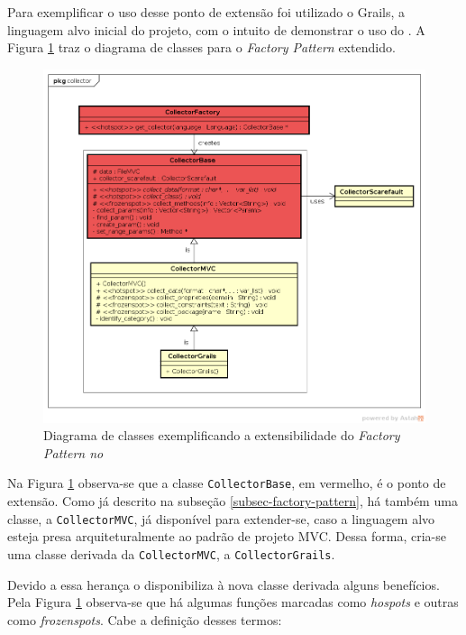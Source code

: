Para exemplificar o uso desse ponto de extensão foi utilizado o \textsf{Grails}, a linguagem
alvo inicial do projeto, com o intuito de demonstrar o uso do \Scarefault. A Figura
\ref{collector-grails-class-diagram} traz o diagrama de classes para o
\textit{Factory Pattern} extendido.
\begin{figure}[h]
  \centering
    \includegraphics[width=\textwidth]{figuras/collector-grails-class-diagram.png}
    \caption{Diagrama de classes exemplificando a extensibilidade do \textit{Factory Pattern no \framework}}
    \label{collector-grails-class-diagram}
\end{figure}
\FloatBarrier

Na Figura \ref{collector-grails-class-diagram} observa-se que a classe
\lstinline|CollectorBase|, em vermelho, é o ponto de extensão. Como já descrito
na subseção \ref{subsec-factory-pattern}, há também uma classe, a \lstinline|CollectorMVC|,
já disponível para extender-se, caso a linguagem alvo esteja presa
arquiteturalmente ao padrão de projeto MVC. Dessa forma, cria-se uma classe
derivada da \lstinline|CollectorMVC|, a \lstinline|CollectorGrails|.

Devido a essa herança o \framework disponibiliza à nova classe derivada
alguns benefícios. Pela Figura \ref{collector-grails-class-diagram} observa-se
que há algumas funções marcadas como \textit{hospots} e outras como 
\textit{frozenspots}. Cabe a definição desses termos:

